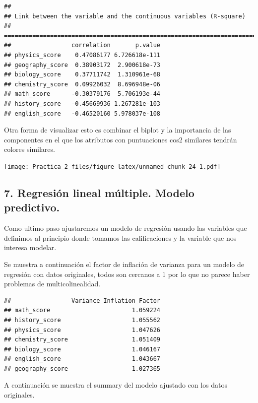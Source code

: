 \documentclass[
]{article}
\begin{document}
\begin{verbatim}
## 
## Link between the variable and the continuous variables (R-square)
## =================================================================================
##                 correlation       p.value
## physics_score    0.47086177 6.726618e-111
## geography_score  0.38903172  2.900618e-73
## biology_score    0.37711742  1.310961e-68
## chemistry_score  0.09926032  8.696948e-06
## math_score      -0.30379176  5.706193e-44
## history_score   -0.45669936 1.267281e-103
## english_score   -0.46520160 5.978037e-108
\end{verbatim}

Otra forma de visualizar esto es combinar el biplot y la importancia de
las componentes en el que los atributos con puntuaciones cos2 similares
tendrán colores similares.

\texttt{[image: Practica\_2\_files/figure-latex/unnamed-chunk-24-1.pdf]}

\hypertarget{regresiuxf3n-lineal-muxfaltiple.-modelo-predictivo.}{%
\subsection{7. Regresión lineal múltiple. Modelo
predictivo.}\label{regresiuxf3n-lineal-muxfaltiple.-modelo-predictivo.}}

Como ultimo paso ajustaremos un modelo de regresión usando las variables
que definimos al principio donde tomamos las calificaciones y la
variable que nos interesa modelar.

Se muestra a continuación el factor de inflación de varianza para un
modelo de regresión con datos originales, todos son cercanos a 1 por lo
que no parece haber problemas de multicolinealidad.

\begin{verbatim}
##                 Variance_Inflation_Factor
## math_score                       1.059224
## history_score                    1.055562
## physics_score                    1.047626
## chemistry_score                  1.051409
## biology_score                    1.046167
## english_score                    1.043667
## geography_score                  1.027365
\end{verbatim}

A continuación se muestra el summary del modelo ajustado con los datos
originales.
\end{document}
